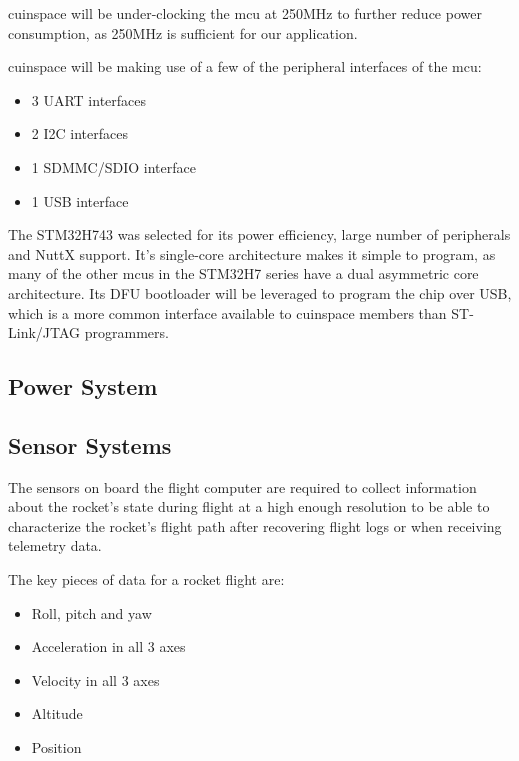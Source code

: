 \Gls{cuinspace} will be under-clocking the \gls{mcu} at 250MHz to further reduce power consumption, as 250MHz is sufficient for our
application.

\Gls{cuinspace} will be making use of a few of the peripheral interfaces of the \gls{mcu}:

\begin{itemize}
    \item 3 UART interfaces
    \item 2 I2C interfaces
    \item 1 SDMMC/SDIO interface
    \item 1 USB interface
\end{itemize}

The STM32H743 was selected for its power efficiency, large number of peripherals and NuttX support. It's single-core
architecture makes it simple to program, as many of the other \glspl{mcu} in the STM32H7 series have a dual asymmetric
core architecture. Its DFU bootloader will be leveraged to program the chip over USB, which is a more common interface
available to \gls{cuinspace} members than ST-Link/JTAG programmers.

\subsection{Power System}


\subsection{Sensor Systems}

The sensors on board the flight computer are required to collect information about the rocket's state during flight at
a high enough resolution to be able to characterize the rocket's flight path after recovering flight logs or when
receiving telemetry data.

The key pieces of data for a rocket flight are:

\begin{itemize}
    \item Roll, pitch and yaw
    \item Acceleration in all 3 axes
    \item Velocity in all 3 axes
    \item Altitude
    \item Position
\end{itemize}

